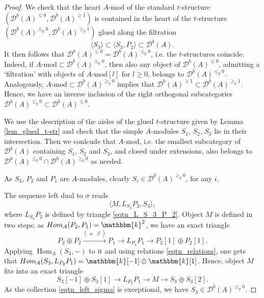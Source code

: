 \documentclass[10pt,a4paper]{amsart}
\newcommand{\Hom}{\mathop{\textrm{Hom}}\nolimits}
\newcommand{\dD}{{\mathcal{D}}}
\newcommand{\kk}{\mathbbm{k}}
\newcommand{\tr}{{\mbox{$t$-struc}\-tu\-r}}
\begin{document}
\begin{proof}
	We check that the heart $A\textrm{-mod}$ of the standard \tr e $(\dD^b(A)^{\leq 0}, \dD^b(A)^{\geq 1})$ is contained in the heart of the \tr e $(\dD^b(A)^{\leq_g 0}, \dD^b(A)^{\geq_g 1})$  glued along the filtration
	$$
	\langle S_3\rangle \subset \langle S_3, P_2 \rangle \subset \dD^b(A).
	$$
	It then follows that $\dD^b(A)^{\leq 0} = \dD^b(A)^{\leq_g0}$, i.e. the \tr es coincide.  Indeed, if $A\textrm{-mod}\subset \dD^b(A)^{\leq_g0}$, then also any object of $\dD^b(A)^{\leq 0}$, admitting a `filtration' with objects of $A\textrm{-mod}[l]$ for $l\geq 0$, belongs to $\dD^b(A)^{\leq_g 0}$. Analogously, $A\textrm{-mod}\subset \dD^b(A)^{\geq_g 0}$ implies that $\dD^b(A)^{\geq 1} \subset \dD^b(A)^{\geq_g 1}$. Hence, we have an inverse inclusion of the right orthogonal subcategories $\dD^b(A)^{\leq_g 0} \subset \dD^b(A)^{\leq 0}$. 
	
	We use the description of the aisles of the glued \tr e given by Lemma \ref{lem_glued_t-str} and check that the simple $A$-modules $S_1$, $S_2$, $S_3$ lie in their intersection. Then we conlcude that $A\textrm{-mod}$, i.e. the smallest subcategory of $\dD^b(A)$ containing $S_1$, $S_2$ and $S_3$, and closed under extensions, also belongs to $\dD^b(A)^{\leq_g0} \cap \dD^b(A)^{\geq_g 0}$ as needed.
	
	As $S_3$, $P_2$ and $P_1$ are $A$-modules, clearly $S_i \in \dD^b(A)^{\geq_g 0}$, for any $i$. 
	
The sequence left dual to $\sigma$ reads
\begin{equation} \label{eqtn_left_sigma}
\langle M, L_{S_3}P_2, S_3 \rangle,
\end{equation}
where $L_{S_3}P_2$ is defined by triangle \eqref{eqtn_L_S_3_P_2}. Object $M$ is defined in two steps; as $\Hom_A(P_2,P_1) = \kk^{2}$, we have an exact triangle
\begin{equation}\label{eqtn_L_P_2P_1}
	P_2 \oplus P_2 \xrightarrow{\left(\begin{array} {cc}\alpha & \beta \end{array}\right)} P_1 \to L_{P_2}P_1 \to P_2[1] \oplus P_2[1].
\end{equation}
Applying $\Hom_A(S_3,-)$ to it and using relations \eqref{eqtn_relations}, one gets that $\Hom_A(S_3, L_{P_2}P_1) = \kk[-1] \oplus \kk[1]$. Hence, object $M$ fits into an exact triangle
\begin{equation}\label{eqtn_M}
	S_3[-1] \oplus S_3[1] \to L_{P_2}P_1 \to M \to S_3 \oplus S_3[2].
\end{equation}
As the collection \eqref{eqtn_left_sigma} is exceptional, we have $S_3\in \dD^b(A)^{\leq_g 0}$.


\end{proof}
\end{document}
